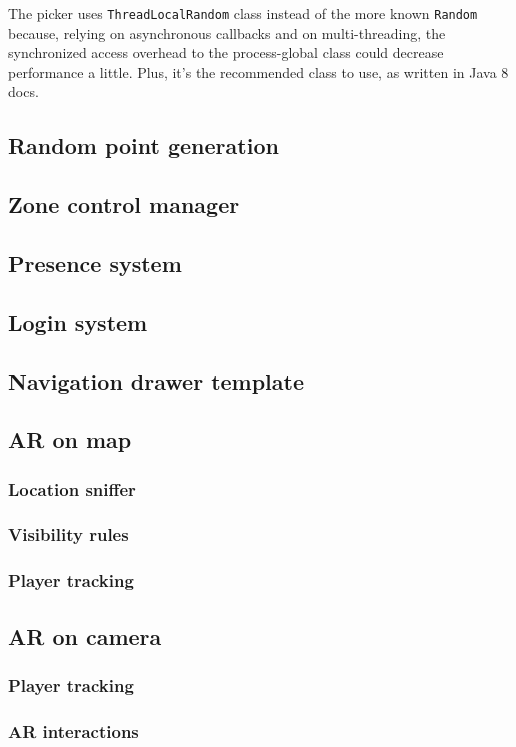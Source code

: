 			The picker uses \lstinline|ThreadLocalRandom| class instead of the more known \lstinline|Random| because, relying on asynchronous callbacks and on multi-threading, the synchronized access overhead to the process-global class could decrease performance a little.
			Plus, it's the recommended class to use, as written in Java 8 docs.
						
		\subsection{Random point generation}\label{focus:point}
		
		\subsection{Zone control manager}\label{focus:zone}
		
		\subsection{Presence system}\label{focus:presence}
		
		\subsection{Login system}\label{focus:splash}
		
		\subsection{Navigation drawer template}\label{focus:drawer}
		
		\subsection{AR on map}\label{focus:map}
		
			\subsubsection{Location sniffer}
			
			\subsubsection{Visibility rules}
			
			\subsubsection{Player tracking}
		
		\subsection{AR on camera}
			
			\subsubsection{Player tracking}
			
			\subsubsection{AR interactions}